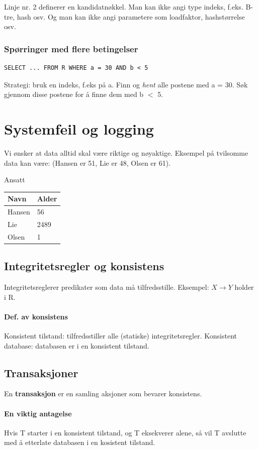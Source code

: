 \documentclass[12pt,a4paper]{article}
\newcommand{\intt}{integritetsregler}
\newcommand{\Intt}{Integritetsregler}
\begin{document}
Linje nr. 2 definerer en kandidatnøkkel. Man kan ikke angi type indeks, f.eks. B-tre, hash osv. Og man kan ikke angi parametere som loadfaktor, hashstørrelse osv.

\subsubsection{Spørringer med flere betingelser}
\begin{lstlisting}
SELECT ... FROM R WHERE a = 30 AND b < 5
\end{lstlisting}

Strategi: bruk en indeks, f.eks på a. Finn og \textit{hent} alle postene med a = 30. Søk gjennom disse postene for å finne dem med b $<$ 5.

\section{Systemfeil og logging}
Vi ønsker at data alltid skal være riktige og nøyaktige. Eksempel på tvilsomme data kan være: (Hansen er 51, Lie er 48, Olsen er 61).
\begin{center}
\textsf{Ansatt}
\begin{tabular}{|l | l|}
\hline
Navn & Alder\\ \hline
Hansen & 56 \\ \hline
Lie & 2489\\ \hline
Olsen & 1\\ \hline
\end{tabular}
\end{center}

\subsection{Integritetsregler og konsistens}
\Intt er predikater som data må tilfredsstille. Eksempel: $X \rightarrow Y$ holder i R.

\paragraph{Def. av konsistens}
Konsistent tilstand: tilfredsstiller alle (statiske) \intt.
Konsistent database: databasen er i en konsistent tilstand.

\subsection{Transaksjoner}
En \textbf{transaksjon} er en samling aksjoner som bevarer konsistens. 
\paragraph{En viktig antagelse} Hvis T starter i en konsistent tilstand, og T eksekverer alene, så vil T avslutte med å etterlate databasen i en kosistent tilstand.
\end{document}
